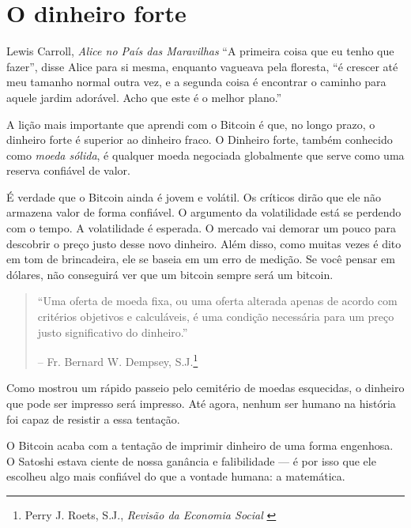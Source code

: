 \chapter{O dinheiro forte}
\label{les:14}

\begin{chapquote}{Lewis Carroll, \textit{Alice no País das Maravilhas}}
\enquote{A primeira coisa que eu tenho que fazer}, disse Alice para si mesma, enquanto vagueava pela floresta, \enquote{é crescer até meu tamanho normal outra vez, e a segunda coisa é encontrar o caminho para aquele jardim adorável. Acho que este é o melhor plano.}
\end{chapquote}

A lição mais importante que aprendi com o Bitcoin é que, no longo prazo, o dinheiro forte é superior ao dinheiro fraco. O Dinheiro forte, também conhecido como \textit{moeda sólida}, é qualquer moeda negociada globalmente que serve como uma reserva confiável de valor.

É verdade que o Bitcoin ainda é jovem e volátil. Os críticos dirão que ele não armazena valor de forma confiável. O argumento da volatilidade está se perdendo com o tempo. A volatilidade é esperada. O mercado vai demorar um pouco para descobrir o preço justo desse novo dinheiro. Além disso, como muitas vezes é dito em tom de brincadeira, ele se baseia em um erro de medição. Se você pensar em dólares, não conseguirá ver que um bitcoin sempre será um bitcoin.

\begin{quotation}\begin{samepage}
\enquote{Uma oferta de moeda fixa, ou uma oferta alterada apenas de acordo com
critérios objetivos e calculáveis, é uma condição necessária para um preço justo significativo do dinheiro.}
\begin{flushright} -- Fr. Bernard W. Dempsey, S.J.\footnote{Perry J. Roets, S.J., \textit{Revisão da Economia Social} \cite{review-social-economy}}
\end{flushright}\end{samepage}\end{quotation}

\newpage

Como mostrou um rápido passeio pelo cemitério de moedas esquecidas, o dinheiro que pode ser impresso será impresso. Até agora, nenhum ser humano na história foi capaz de resistir a essa tentação.

O Bitcoin acaba com a tentação de imprimir dinheiro de uma forma engenhosa. O Satoshi estava ciente de nossa ganância e falibilidade --- é por isso que ele escolheu algo mais confiável do que a vontade humana: a matemática.

